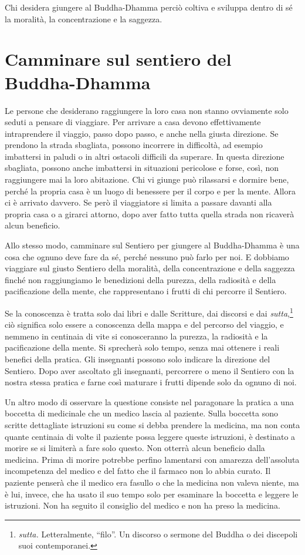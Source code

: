 Chi desidera giungere al Buddha-Dhamma perciò coltiva e sviluppa dentro
di sé la moralità, la concentrazione e la saggezza.

\section{Camminare sul sentiero del Buddha-Dhamma}

Le persone che desiderano raggiungere la loro casa non stanno ovviamente
solo seduti a pensare di viaggiare. Per arrivare a casa devono
effettivamente intraprendere il viaggio, passo dopo passo, e anche nella
giusta direzione. Se prendono la strada sbagliata, possono incorrere in
difficoltà, ad esempio imbattersi in paludi o in altri ostacoli
difficili da superare. In questa direzione sbagliata, possono anche
imbattersi in situazioni pericolose e forse, così, non raggiungere mai
la loro abitazione. Chi vi giunge può rilassarsi e dormire bene, perché
la propria casa è un luogo di benessere per il corpo e per la mente.
Allora ci è arrivato davvero. Se però il viaggiatore si limita a passare
davanti alla propria casa o a girarci attorno, dopo aver fatto tutta
quella strada non ricaverà alcun beneficio.

Allo stesso modo, camminare sul Sentiero per giungere al Buddha-Dhamma è
una cosa che ognuno deve fare da sé, perché nessuno può farlo per noi. E
dobbiamo viaggiare sul giusto Sentiero della moralità, della
concentrazione e della saggezza finché non raggiungiamo le benedizioni
della purezza, della radiosità e della pacificazione della mente, che
rappresentano i frutti di chi percorre il Sentiero.

Se la conoscenza è tratta solo dai libri e dalle Scritture, dai discorsi
e dai \emph{sutta},\footnote{\emph{sutta.} Letteralmente, ``filo''. Un
  discorso o sermone del Buddha o dei discepoli suoi contemporanei.} ciò
significa solo essere a conoscenza della mappa e del percorso del
viaggio, e nemmeno in centinaia di vite si conosceranno la purezza, la
radiosità e la pacificazione della mente. Si sprecherà solo tempo, senza
mai ottenere i reali benefici della pratica. Gli insegnanti possono solo
indicare la direzione del Sentiero. Dopo aver ascoltato gli insegnanti,
percorrere o meno il Sentiero con la nostra stessa pratica e farne così
maturare i frutti dipende solo da ognuno di noi.

Un altro modo di osservare la questione consiste nel paragonare la
pratica a una boccetta di medicinale che un medico lascia al paziente.
Sulla boccetta sono scritte dettagliate istruzioni su come si debba
prendere la medicina, ma non conta quante centinaia di volte il paziente
possa leggere queste istruzioni, è destinato a morire se si limiterà a
fare solo questo. Non otterrà alcun beneficio dalla medicina. Prima di
morire potrebbe perfino lamentarsi con amarezza dell'assoluta
incompetenza del medico e del fatto che il farmaco non lo abbia curato.
Il paziente penserà che il medico era fasullo o che la medicina non
valeva niente, ma è lui, invece, che ha usato il suo tempo solo per
esaminare la boccetta e leggere le istruzioni. Non ha seguito il
consiglio del medico e non ha preso la medicina.

